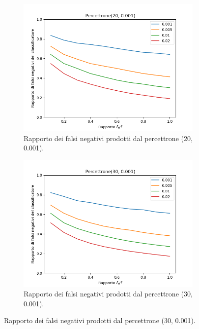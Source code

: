 \documentclass[../../main.tex]{subfiles}
\begin{document}
    \begin{figure}[H]
        \centering
        \begin{subfigure}[b]{0.49\textwidth}
            \centering
            \includegraphics[width = \textwidth]{immagini/7/LBF/Percettrone(20, 0.001)_FNR.png}
            \caption{Rapporto dei falsi negativi prodotti dal percettrone (20, 0.001).}
            \label{fig:LBFFNRPercettrone20}
        \end{subfigure}
        \begin{subfigure}[b]{0.49\textwidth}
            \centering
            \includegraphics[width = \textwidth]{immagini/7/LBF/Percettrone(30, 0.001)_FNR.png}
            \caption{Rapporto dei falsi negativi prodotti dal percettrone (30, 0.001).}

\end{subfigure}
\end{figure}
\end{document}
